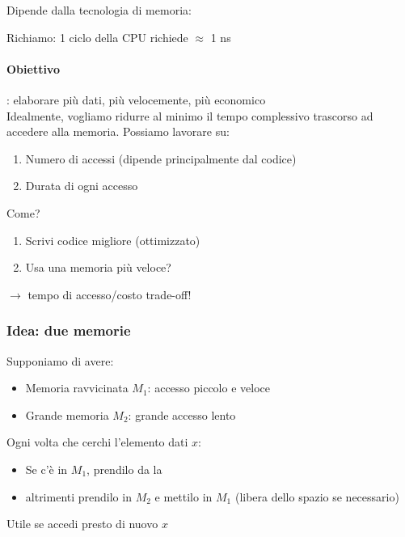 \documentclass[12pt,a4paper]{article}
\begin{document}
\SmallSep \noindent
Dipende dalla tecnologia di memoria:
\begin{center}
\end{center}
Richiamo: 1 ciclo della CPU richiede $\approx$ 1 ns

\paragraph{Obiettivo}: elaborare più dati, più velocemente, più economico\\
Idealmente, vogliamo ridurre al minimo il tempo complessivo trascorso ad accedere alla memoria. Possiamo lavorare su:
\begin{enumerate}
\item Numero di accessi (dipende principalmente dal codice)
\item Durata di ogni accesso
\end{enumerate}
Come?
\begin{enumerate}
\item Scrivi codice migliore (ottimizzato)
\item Usa una memoria più veloce? 
\end{enumerate}
$\rightarrow$ tempo di accesso/costo trade-off!

\subsubsection{Idea: due memorie}
Supponiamo di avere:
\begin{itemize}
\item Memoria ravvicinata $M_1$: accesso piccolo e veloce
\item Grande memoria $M_2$: grande accesso lento
\end{itemize}
Ogni volta che cerchi l'elemento dati $x$:
\begin{itemize}
\item Se c'è in $M_1$, prendilo da la
\item altrimenti prendilo in $M_2$ e mettilo in $M_1$ (libera dello spazio se necessario)
\end{itemize}
Utile se accedi presto di nuovo $x$
\end{document}
